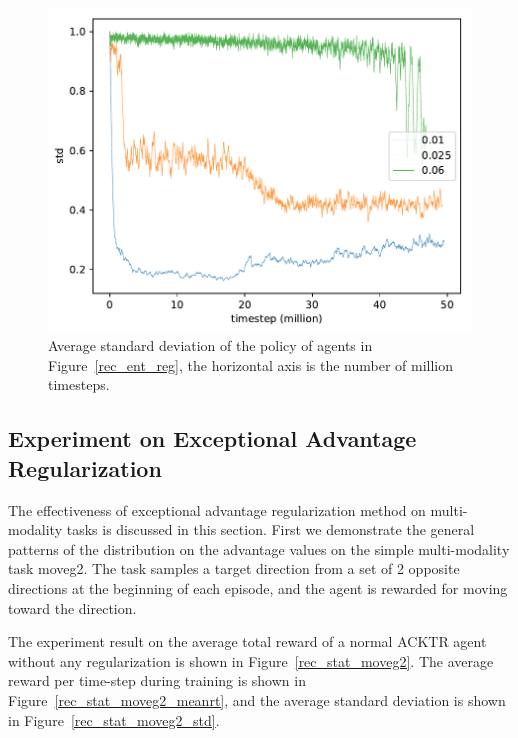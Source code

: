 \begin{figure}[!htbp]
	\includegraphics[width=\textwidth]{images/rec_180609_std_ent_reg.pdf}
	\centering
	\caption{Average standard deviation of the policy of agents in Figure~\ref{rec_ent_reg}, the horizontal axis is the number of million timesteps.}\label{rec_std_ent_reg}
\end{figure}

\subsection{Experiment on Exceptional Advantage Regularization}
The effectiveness of exceptional advantage regularization method on multi-modality tasks is discussed in this section.
First we demonstrate the general patterns of the distribution on the advantage values on the simple multi-modality task moveg2. The task samples a target direction from a set of 2 opposite directions at the beginning of each episode, and the agent is rewarded for moving toward the direction.

The experiment result on the average total reward of a normal ACKTR agent without any regularization is shown in Figure~\ref{rec_stat_moveg2}. The average reward per time-step during training is shown in Figure~\ref{rec_stat_moveg2_meanrt}, and the average standard deviation is shown in Figure~\ref{rec_stat_moveg2_std}.


